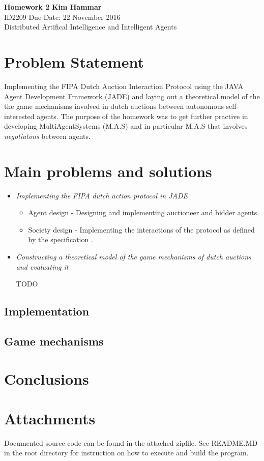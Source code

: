 \documentclass[a4paper, 11pt]{article}
\begin{document}
\noindent
\large\textbf{Homework 2} \hfill \textbf{Kim Hammar} \\
\normalsize ID2209 \hfill Due Date: 22 November 2016 \\
Distributed Artifical Intelligence and Intelligent Agents \hfill \\

\section*{Problem Statement}
Implementing the FIPA Dutch Auction Interaction Protocol \citep{fipa_dutch} using the JAVA Agent Development Framework (JADE) \citep{jade} and laying out a theoretical model of the the game mechanisms involved in dutch auctions between autonomous self-interested agents. The purpose of the homework was to get further practive in developing MultiAgentSystems (M.A.S) and in particular M.A.S that involves \textit{negotiatons} between agents.

\section*{Main problems and solutions}
\begin{itemize}
\item \textit{Implementing the FIPA dutch action protocol in JADE}
\begin{itemize}
\item Agent design - Designing and implementing auctioneer and bidder agents.
\item Society design - Implementing  the interactions of the protocol as defined by the specification \citep{fipa_dutch}.
\end{itemize}
\item \textit{Constructing a theoretical model of the game mechanisms of dutch auctions and evaluating it}

TODO
\end{itemize}

\subsection*{Implementation}

\subsection*{Game mechanisms}

\section*{Conclusions}


\section*{Attachments}
Documented source code can be found in the attached zipfile. See README.MD in the root directory for instruction on how to execute and build the program.

{}

\end{document}
